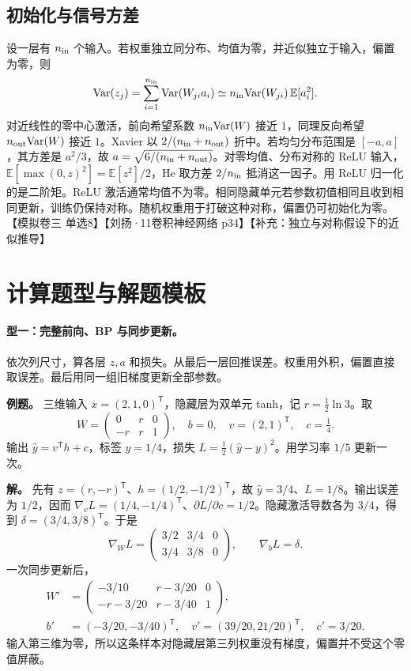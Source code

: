 \documentclass[UTF8,a4paper,zihao=-4,fontset=fandol]{ctexrep}
\begin{document}
\subsection*{初始化与信号方差}

设一层有 $n_{\rm in}$ 个输入。若权重独立同分布、均值为零，并近似独立于输入，偏置为零，则
\[
 {\rm Var}(z_j)
 =\sum_{i=1}^{n_{\rm in}} {\rm Var}(W_{ji}a_i)
 \simeq n_{\rm in}{\rm Var}(W_{ji})\,\mathbb E[a_i^2].
\]
对近线性的零中心激活，前向希望系数 $n_{\rm in}{\rm Var}(W)$ 接近 $1$，同理反向希望 $n_{\rm out}{\rm Var}(W)$ 接近 $1$。Xavier 以 $2/(n_{\rm in}+n_{\rm out})$ 折中。若均匀分布范围是 $[-a,a]$，其方差是 $a^2/3$，故 $a=\sqrt{6/(n_{\rm in}+n_{\rm out})}$。对零均值、分布对称的 ReLU 输入，$\mathbb E[\max(0,z)^2]=\mathbb E[z^2]/2$，He 取方差 $2/n_{\rm in}$ 抵消这一因子。用 ReLU 归一化的是二阶矩。ReLU 激活通常均值不为零。相同隐藏单元若参数初值相同且收到相同更新，训练仍保持对称。随机权重用于打破这种对称，偏置仍可初始化为零。【模拟卷三 单选8】【刘扬·11卷积神经网络 p34】【补充：独立与对称假设下的近似推导】

\section{计算题型与解题模板}

\paragraph{型一：完整前向、BP 与同步更新。}
依次列尺寸，算各层 $z,a$ 和损失。从最后一层回推误差。权重用外积，偏置直接取误差。最后用同一组旧梯度更新全部参数。

\textbf{例题。} 三维输入 $x=(2,1,0)^{\mathsf T}$，隐藏层为双单元 tanh，记 $r=\tfrac12\ln3$。取
\[
 W=\begin{pmatrix}0&r&0\\-r&r&1\end{pmatrix},
 \quad b=0,\quad v=(2,1)^{\mathsf T},\quad c=\tfrac14 .
\]
输出 $\hat y=v^{\mathsf T}h+c$，标签 $y=1/4$，损失 $L=\tfrac12(\hat y-y)^2$。用学习率 $1/5$ 更新一次。

\textbf{解。} 先有 $z=(r,-r)^{\mathsf T}$、$h=(1/2,-1/2)^{\mathsf T}$，故 $\hat y=3/4$、$L=1/8$。输出误差为 $1/2$，因而 $\nabla_v L=(1/4,-1/4)^{\mathsf T}$、$\partial L/\partial c=1/2$。隐藏激活导数各为 $3/4$，得到 $\delta=(3/4,3/8)^{\mathsf T}$。于是
\[
 \nabla_W L
 =\begin{pmatrix}3/2&3/4&0\\3/4&3/8&0\end{pmatrix},
 \qquad \nabla_b L=\delta .
\]
一次同步更新后，
\begin{align*}
 W'&=\begin{pmatrix}-3/10&r-3/20&0\\-r-3/20&r-3/40&1\end{pmatrix},\\
 b'&=(-3/20,-3/40)^{\mathsf T},\quad
 v'=(39/20,21/20)^{\mathsf T},\quad c'=3/20.
\end{align*}
输入第三维为零，所以这条样本对隐藏层第三列权重没有梯度，偏置并不受这个零值屏蔽。
\end{document}
